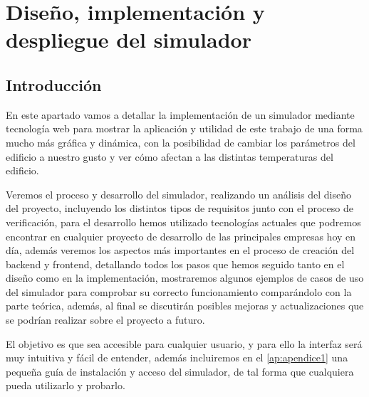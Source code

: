 \chapter{Diseño, implementación y despliegue del simulador}
\section{Introducción}
En este apartado vamos a detallar la implementación de un simulador mediante tecnología web para mostrar la aplicación y utilidad de este trabajo de una forma mucho más gráfica y dinámica, con la posibilidad de cambiar los parámetros del edificio a nuestro gusto y ver cómo afectan a las distintas temperaturas del edificio.

Veremos el proceso y desarrollo del simulador, realizando un análisis del diseño del proyecto, incluyendo los distintos tipos de requisitos junto con el proceso de verificación, para el desarrollo hemos utilizado tecnologías actuales que podremos encontrar en cualquier proyecto de desarrollo de las principales empresas hoy en día, además veremos los aspectos más importantes en el proceso de creación del backend y frontend, detallando todos los pasos que hemos seguido tanto en el diseño como en la implementación, mostraremos algunos ejemplos de casos de uso del simulador para comprobar su correcto funcionamiento comparándolo con la parte teórica, además, al final se discutirán posibles mejoras y actualizaciones que se podrían realizar sobre el proyecto a futuro.

El objetivo es que sea accesible para cualquier usuario, y para ello la interfaz será muy intuitiva y fácil de entender, además incluiremos en el \autoref{ap:apendice1} una pequeña guía de instalación y acceso del simulador, de tal forma que cualquiera pueda utilizarlo y probarlo.
